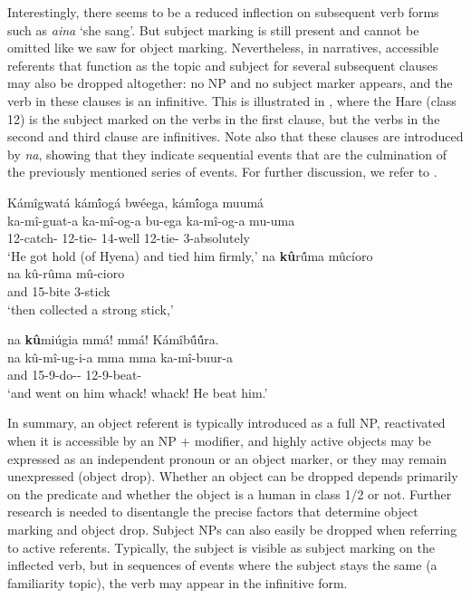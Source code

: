 \documentclass[output=paper]{langscibook}
\begin{document}
\z


Interestingly, there seems to be a reduced inflection on subsequent verb forms such as \textit{aina} ‘she sang’. But subject marking is still present and cannot be omitted like we saw for object marking. Nevertheless, in narratives, accessible referents that function as the topic and subject for several subsequent clauses may also be dropped altogether: no NP and no subject marker appears, and the verb in these clauses is an infinitive. This is illustrated in , where the Hare (class 12) is the subject marked on the verbs in the first clause, but the verbs in the second and third clause are infinitives. Note also that these clauses are introduced by \textit{na}, showing that they indicate sequential events that are the culmination of the previously mentioned series of events. For further discussion, we refer to \citet{Kanampiu2023}.

\ea
\label{bkm:Ref118270837}
Kámîgwatá kám\'{î}ogá bwéega, kám\'{î}oga muumá\\
\gll
ka-mî-guat-a  ka-mî-og-a  bu-ega  ka-mî-og-a  mu-uma\\
12\OM{}-catch-\FV{} 12\OM{}-tie-\FV{} 14-well 12\OM{}-tie-\FV{} 3-absolutely\\
\glt
‘He got hold (of Hyena) and tied him firmly,’
\sn
{na \textbf{kû}}{r\'{û}ma mûcíoro}\\
\gll
na kû-rûma  mû-cioro\\
and 15-bite 3-stick\\
\glt
‘then collected a strong stick,’

\sn
{na \textbf{kû}}{miúgia mmá! mmá! Kámîb\'{û}\'{û}ra.}\\
\gll
na kû-mî-ug-i-a  mma  mma  ka-mî-buur-a\\
and 15-9\OM{}-do-\IC-\FV{} \IDEO{}  \IDEO{} 12\SM{}-9\OM{}-beat-\FV{}\\
\glt
‘and went on him whack! whack! He beat him.’

\z

In summary, an object referent is typically introduced as a full NP, reactivated when it is accessible by an NP + modifier, and highly active objects may be expressed as an independent pronoun or an object marker, or they may remain unexpressed (object drop). Whether an object can be dropped depends primarily on the predicate and whether the object is a human in class 1/2 or not. Further research is needed to disentangle the precise factors that determine object marking and object drop. Subject NPs can also easily be dropped when referring to active referents. Typically, the subject is visible as subject marking on the inflected verb, but in sequences of events where the subject stays the same (a familiarity topic), the verb may appear in the infinitive form.
\end{document}
